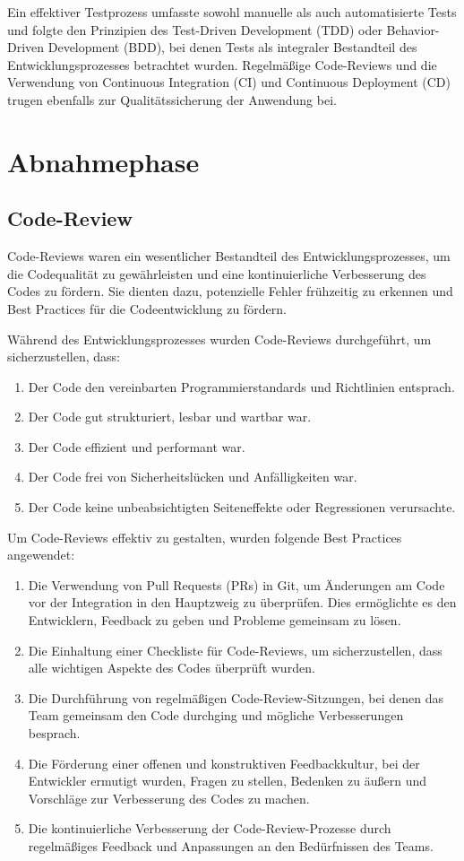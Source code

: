 \begin{flushleft}
Ein effektiver Testprozess umfasste sowohl manuelle als auch automatisierte Tests und folgte den Prinzipien des Test-Driven Development (TDD) oder Behavior-Driven Development (BDD), bei denen Tests als integraler Bestandteil des Entwicklungsprozesses betrachtet wurden. Regelmäßige Code-Reviews und die Verwendung von Continuous Integration (CI) und Continuous Deployment (CD) trugen ebenfalls zur Qualitätssicherung der Anwendung bei.


\section{Abnahmephase}

\subsection{Code-Review}
Code-Reviews waren ein wesentlicher Bestandteil des Entwicklungsprozesses, um die Codequalität zu gewährleisten und eine kontinuierliche Verbesserung des Codes zu fördern. Sie dienten dazu, potenzielle Fehler frühzeitig zu erkennen und Best Practices für die Codeentwicklung zu fördern.

Während des Entwicklungsprozesses wurden Code-Reviews durchgeführt, um sicherzustellen, dass:

\begin{enumerate}
\item Der Code den vereinbarten Programmierstandards und Richtlinien entsprach.
\item Der Code gut strukturiert, lesbar und wartbar war.
\item Der Code effizient und performant war.
\item Der Code frei von Sicherheitslücken und Anfälligkeiten war.
\item Der Code keine unbeabsichtigten Seiteneffekte oder Regressionen verursachte.
\end{enumerate}

Um Code-Reviews effektiv zu gestalten, wurden folgende Best Practices angewendet:

\begin{enumerate}
\item Die Verwendung von Pull Requests (PRs) in Git, um Änderungen am Code vor der Integration in den Hauptzweig zu überprüfen. Dies ermöglichte es den Entwicklern, Feedback zu geben und Probleme gemeinsam zu lösen.
\item Die Einhaltung einer Checkliste für Code-Reviews, um sicherzustellen, dass alle wichtigen Aspekte des Codes überprüft wurden.
\item Die Durchführung von regelmäßigen Code-Review-Sitzungen, bei denen das Team gemeinsam den Code durchging und mögliche Verbesserungen besprach.
\item Die Förderung einer offenen und konstruktiven Feedbackkultur, bei der Entwickler ermutigt wurden, Fragen zu stellen, Bedenken zu äußern und Vorschläge zur Verbesserung des Codes zu machen.
\item Die kontinuierliche Verbesserung der Code-Review-Prozesse durch regelmäßiges Feedback und Anpassungen an den Bedürfnissen des Teams.
\end{enumerate}


\end{flushleft}
